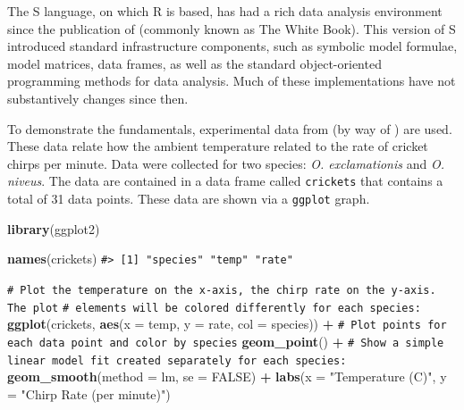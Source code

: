 \documentclass[11pt]{book}
\newenvironment{Shaded}{\begin{snugshade}}{\end{snugshade}}
\newcommand{\CommentTok}[1]{\textcolor[rgb]{0.56,0.35,0.01}{\textit{#1}}}
\newcommand{\DataTypeTok}[1]{\textcolor[rgb]{0.13,0.29,0.53}{#1}}
\newcommand{\KeywordTok}[1]{\textcolor[rgb]{0.13,0.29,0.53}{\textbf{#1}}}
\newcommand{\NormalTok}[1]{#1}
\newcommand{\OperatorTok}[1]{\textcolor[rgb]{0.81,0.36,0.00}{\textbf{#1}}}
\newcommand{\OtherTok}[1]{\textcolor[rgb]{0.56,0.35,0.01}{#1}}
\newcommand{\StringTok}[1]{\textcolor[rgb]{0.31,0.60,0.02}{#1}}
\renewcommand{\CommentTok}[1]{\textcolor[rgb]{0.41,0.41,0.41}{\texttt{#1}}}
\begin{document}
The S language, on which R is based, has had a rich data analysis environment since the publication of \citet{WhiteBook} (commonly known as The White Book). This version of S introduced standard infrastructure components, such as symbolic model formulae, model matrices, data frames, as well as the standard object-oriented programming methods for data analysis. Much of these implementations have not substantively changes since then.

To demonstrate the fundamentals, experimental data from \citet{mcdonald2009} (by way of \citet{mangiafico2015}) are used. These data relate how the ambient temperature related to the rate of cricket chirps per minute. Data were collected for two species: \emph{O. exclamationis} and \emph{O. niveus}. The data are contained in a data frame called \texttt{crickets} that contains a total of 31 data points. These data are shown via a \texttt{ggplot} graph.

\begin{Shaded}
\begin{Highlighting}[]
\KeywordTok{library}\NormalTok{(ggplot2)}

\KeywordTok{names}\NormalTok{(crickets)}
\CommentTok{#> [1] "species" "temp"    "rate"}

\CommentTok{# Plot the temperature on the x-axis, the chirp rate on the y-axis. The plot}
\CommentTok{# elements will be colored differently for each species:}
\KeywordTok{ggplot}\NormalTok{(crickets, }\KeywordTok{aes}\NormalTok{(}\DataTypeTok{x =}\NormalTok{ temp, }\DataTypeTok{y =}\NormalTok{ rate, }\DataTypeTok{col =}\NormalTok{ species)) }\OperatorTok{+}\StringTok{ }
\StringTok{  }\CommentTok{# Plot points for each data point and color by species}
\StringTok{  }\KeywordTok{geom_point}\NormalTok{() }\OperatorTok{+}\StringTok{ }
\StringTok{  }\CommentTok{# Show a simple linear model fit created separately for each species:}
\StringTok{  }\KeywordTok{geom_smooth}\NormalTok{(}\DataTypeTok{method =}\NormalTok{ lm, }\DataTypeTok{se =} \OtherTok{FALSE}\NormalTok{) }\OperatorTok{+}\StringTok{ }
\StringTok{  }\KeywordTok{labs}\NormalTok{(}\DataTypeTok{x =} \StringTok{"Temperature (C)"}\NormalTok{, }\DataTypeTok{y =} \StringTok{"Chirp Rate (per minute)"}\NormalTok{)}
\end{Highlighting}
\end{Shaded}
\end{document}
